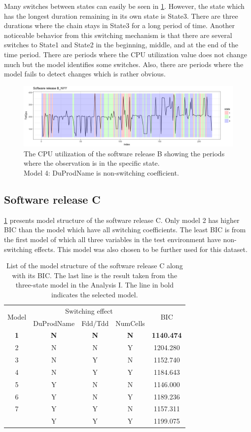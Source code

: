 Many switches between states can easily be seen in \ref{L16B_NYY}.
However, the state which has the longest duration remaining in its
own state is State3. There are three durations where the chain stays
in State3 for a long period of time. Another noticeable behavior from
this switching mechanism is that there are several switches to State1
and State2 in the beginning, middle, and at the end of the time period.
There are periods where the CPU utilization value does not change
much but the model identifies some switches. Also, there are periods
where the model fails to detect changes which is rather obvious.

\begin{figure}[H]
\begin{centering}
\includegraphics[scale=0.35]{picture/L16B_NYY1}
\par\end{centering}
\caption{The CPU utilization of the software release B showing the periods
where the observation is in the specific state. \protect \\
Model 4: DuProdName is non-switching coefficient.}
\label{L16B_NYY}
\end{figure}


\subsection{Software release C}

\ref{L17A_switch} presents model structure of the software release
C. Only model 2 has higher BIC than the model which have all switching
coefficients. The least BIC is from the first model of which all three
variables in the test environment have non-switching effects. This
model was also chosen to be further used for this dataset.

\begin{table}[h]
\caption{List of the model structure of the software release C along with its
BIC. The last line is the result taken from the three-state model
in the Analysis I. The line in bold indicates the selected model.}
\label{L17A_switch}
\centering{}%
\begin{tabular}{ccccc}
\toprule 
\multirow{2}{*}{Model} & \multicolumn{3}{c}{Switching effect} & \multirow{2}{*}{BIC}\tabularnewline
\cmidrule{2-4} 
 & DuProdName & Fdd/Tdd & NumCells & \tabularnewline
\midrule
\midrule 
\textbf{1} & \textbf{N} & \textbf{N} & \textbf{N} & \textbf{1140.474}\tabularnewline
2 & N & N & Y & 1204.280\tabularnewline
3 & N & Y & N & 1152.740\tabularnewline
4 & N & Y & Y & 1184.643\tabularnewline
5 & Y & N & N & 1146.000\tabularnewline
6 & Y & N & Y & 1189.236\tabularnewline
7 & Y & Y & N & 1157.311\tabularnewline
\midrule
 & Y & Y & Y & 1199.075\tabularnewline
\bottomrule
\end{tabular}
\end{table}


